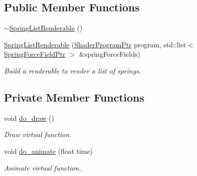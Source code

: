 \subsection*{Public Member Functions}
\begin{DoxyCompactItemize}
\item 
\hyperlink{classSpringListRenderable_aca69606b94a00da8d8a1dedf9f3fe9f1}{$\sim$\+Spring\+List\+Renderable} ()
\item 
\hyperlink{classSpringListRenderable_ae453b5a8d045e491f00abff743a29942}{Spring\+List\+Renderable} (\hyperlink{ShaderProgram_8hpp_af8e4af1ad4c53875ee5d32ab7e1f4966}{Shader\+Program\+Ptr} program, std\+::list$<$ \hyperlink{SpringForceField_8hpp_a3f4fbe1af2c46f8804b45f804dacc708}{Spring\+Force\+Field\+Ptr} $>$ \&spring\+Force\+Fields)
\begin{DoxyCompactList}\small\item\em Build a renderable to render a list of springs. \end{DoxyCompactList}\end{DoxyCompactItemize}
\subsection*{Private Member Functions}
\begin{DoxyCompactItemize}
\item 
void \hyperlink{classSpringListRenderable_a3188f3904567441c4578ebbbc1d4db92}{do\+\_\+draw} ()
\begin{DoxyCompactList}\small\item\em Draw virtual function. \end{DoxyCompactList}\item 
void \hyperlink{classSpringListRenderable_a32460ca63254ddaf716697b8402c8a37}{do\+\_\+animate} (float time)
\begin{DoxyCompactList}\small\item\em Animate virtual function. \end{DoxyCompactList}\end{DoxyCompactItemize}
